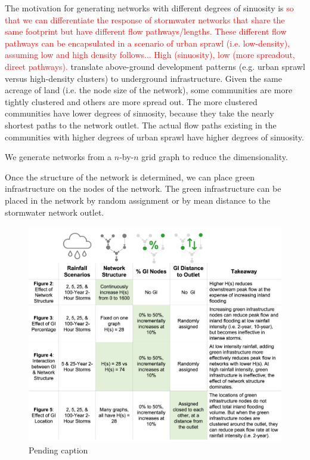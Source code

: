 \documentclass[draft]{agujournal2019}
\begin{document}

The motivation for generating networks with different degrees of sinuosity is \textcolor{red}{so that we can differentiate the response of stormwater networks that share the same footprint but have different flow pathways/lengths. These different flow pathways can be encapsulated in a scenario of urban sprawl (i.e. low-density), assuming low and high density follows... High (sinuosity), low (more spreadout, direct pathways).} translate above-ground development patterns (e.g. urban sprawl versus high-density clusters) to underground infrastructure. Given the same acreage of land (i.e. the node size of the network), some communities are more tightly clustered and others are more spread out. The more clustered communities have lower degrees of sinuosity, because they take the nearly shortest paths to the network outlet. The actual flow paths existing in the communities with higher degrees of urban sprawl have higher degrees of sinuosity. 

We generate networks from a $n$-by-$n$ grid graph to reduce the dimensionality. 

Once the structure of the network is determined, we can place green infrastructure on the nodes of the network. The green infrastructure can be placed in the network by random assignment or by mean distance to the stormwater network outlet. 

\begin{figure}
 \noindent\includegraphics[width=\textwidth]{schema.png}
\caption{Pending caption}
 \label{fig:schema}
\end{figure}
\end{document}
